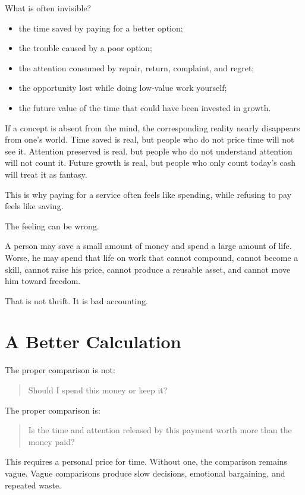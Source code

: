 What is often invisible?

\begin{itemize}
\item the time saved by paying for a better option;
\item the trouble caused by a poor option;
\item the attention consumed by repair, return, complaint, and regret;
\item the opportunity lost while doing low-value work yourself;
\item the future value of the time that could have been invested in growth.
\end{itemize}

If a concept is absent from the mind, the corresponding reality nearly disappears from one's world. Time saved is real, but people who do not price time will not see it. Attention preserved is real, but people who do not understand attention will not count it. Future growth is real, but people who only count today's cash will treat it as fantasy.

This is why paying for a service often feels like spending, while refusing to pay feels like saving.

The feeling can be wrong.

A person may save a small amount of money and spend a large amount of life. Worse, he may spend that life on work that cannot compound, cannot become a skill, cannot raise his price, cannot produce a reusable asset, and cannot move him toward freedom.

That is not thrift. It is bad accounting.

\section*{A Better Calculation}

The proper comparison is not:

\begin{quote}
Should I spend this money or keep it?
\end{quote}

The proper comparison is:

\begin{quote}
Is the time and attention released by this payment worth more than the money paid?
\end{quote}

This requires a personal price for time. Without one, the comparison remains vague. Vague comparisons produce slow decisions, emotional bargaining, and repeated waste.

